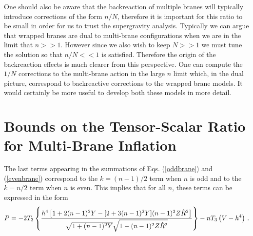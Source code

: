 One should also be aware that the backreaction of multiple branes will
typically introduce corrections of the form $n/N$, therefore it is important
for this ratio to be small in order for us to trust the supergravity analysis.
Typically we can argue that wrapped branes are dual to multi-brane configurations when
we are in the limit that $n>>1$. However since we also wish to keep $N>>1$ we must tune
the solution so that $n/N<<1$ is satisfied. Therefore the origin of the backreaction effects
is much clearer from this perspective. One can compute the $1/N$ corrections to the multi-brane
action in the large $n$ limit \cite{Ward:2007gs} which, in the dual picture, correspond to
backreactive corrections
to the wrapped brane models. It would certainly be more useful to develop both these models in more
detail.

% 
% 
\section{Bounds on the Tensor-Scalar Ratio for Multi-Brane 
Inflation} 
\label{sec:multibounds}

The last terms appearing in the summations of Eqs. (\ref{oddbrane}) 
and (\ref{evenbrane}) correspond  to the $k=(n-1)/2$ 
term when $n$ is odd and to the $k=n/2$ term when $n$ is even. This 
implies that for all $n$, these terms can be expressed in the form 
\begin{equation}
\label{unifiedgenP}
P = -2T_3 \left\{ \frac{h^4 \left[ 1+2(n-1)^2Y
- [ 2+3(n-1)^2Y] (n-1)^2Z\dot{R}^2  \right]}{\sqrt{1+(n-1)^2Y}
\sqrt{1-(n-1)^2Z\dot{R}^2}} 
 \right\} -n T_3 \left( V -h^4 \right) \,.
\end{equation}

